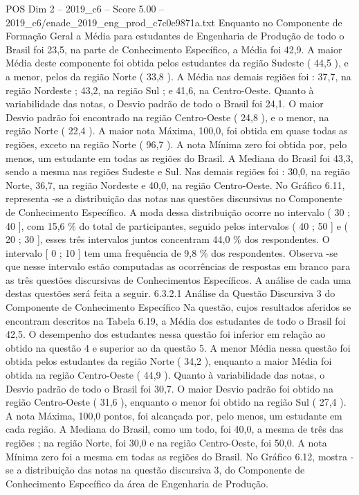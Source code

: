 \begin{textsample}{POS Dim 2 – 2019\_c6 – Score 5.00 – 2019\_c6/enade\_2019\_eng\_prod\_c7c0e9871a.txt}
Enquanto no Componente de Formação Geral a Média para estudantes de Engenharia de Produção de todo o Brasil foi 23,5, na parte de Conhecimento Específico, a Média foi 42,9.
A maior Média deste componente foi obtida pelos estudantes da região Sudeste ( 44,5 ), e a menor, pelos da região Norte ( 33,8 ).
A Média nas demais regiões foi : 37,7, na região Nordeste ; 43,2, na região Sul ; e 41,6, na Centro-Oeste.
Quanto à variabilidade das notas, o Desvio padrão de todo o Brasil foi 24,1.
O maior Desvio padrão foi encontrado na região Centro-Oeste ( 24,8 ), e o menor, na região Norte ( 22,4 ).
A maior nota Máxima, 100,0, foi obtida em quase todas as regiões, exceto na região Norte ( 96,7 ).
A nota Mínima zero foi obtida por, pelo menos, um estudante em todas as regiões do Brasil.
A Mediana do Brasil foi 43,3, sendo a mesma nas regiões Sudeste e Sul.
Nas demais regiões foi : 30,0, na região Norte, 36,7, na região Nordeste e 40,0, na região Centro-Oeste.
No Gráfico 6.11, representa -se a distribuição das notas nas questões discursivas no Componente de Conhecimento Específico.
A moda dessa distribuição ocorre no intervalo ( 30 ; 40 ], com 15,6 \% do total de participantes, seguido pelos intervalos ( 40 ; 50 ] e ( 20 ; 30 ], esses três intervalos juntos concentram 44,0 \% dos respondentes.
O intervalo [ 0 ; 10 ] tem uma frequência de 9,8 \% dos respondentes.
Observa -se que nesse intervalo estão computadas as ocorrências de respostas em branco para as três questões discursivas de Conhecimentos Específicos.
A análise de cada uma destas questões será feita a seguir. 6.3.2.1 Análise da Questão Discursiva 3 do Componente de Conhecimento Específico Na questão, cujos resultados aferidos se encontram descritos na Tabela 6.19, a Média dos estudantes de todo o Brasil foi 42,5.
O desempenho dos estudantes nessa questão foi inferior em relação ao obtido na questão 4 e superior ao da questão 5.
A menor Média nessa questão foi obtida pelos estudantes da região Norte ( 34,2 ), enquanto a maior Média foi obtida na região Centro-Oeste ( 44,9 ).
Quanto à variabilidade das notas, o Desvio padrão de todo o Brasil foi 30,7.
O maior Desvio padrão foi obtido na região Centro-Oeste ( 31,6 ), enquanto o menor foi obtido na região Sul ( 27,4 ).
A nota Máxima, 100,0 pontos, foi alcançada por, pelo menos, um estudante em cada região.
A Mediana do Brasil, como um todo, foi 40,0, a mesma de três das regiões ; na região Norte, foi 30,0 e na região Centro-Oeste, foi 50,0.
A nota Mínima zero foi a mesma em todas as regiões do Brasil.
No Gráfico 6.12, mostra -se a distribuição das notas na questão discursiva 3, do Componente de Conhecimento Específico da área de Engenharia de Produção.

\end{textsample}
